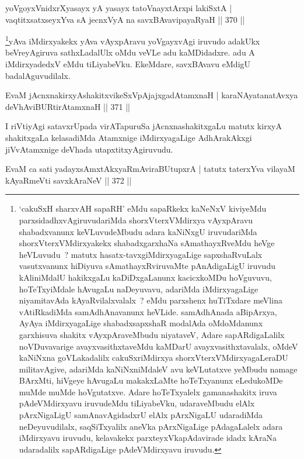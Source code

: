 \begin{shl}
yoVgoyxVnidxrXyasayx yA yasayx tatoV\s nayxtArxpi lakiSxtA |
vaqtitxsatxseyxYva sA jecnxVyA na savxBAvavipayaRyaH \hfill || 370 ||
\end{shl}

\begin{artha}
\footnote{`cakuSxH sharxvAH sapaRH' eMdu sapaRkekx kaNeNxV kiviyeMdu parxsidadhxvAgiruvudariMda shorxVterxVMdirxya vAyxpAravu shabadxvanunx keVLuvudeMbudu adara kaNiNxgU iruvudariMda shorxVterxVMdirxyakekx shabadxgarxhaNa sAmathayxRveMdu heVge heVLuvudu~? matutx hasatx-tavxgiMdirxyagaLige sapxshaRvuLalx vasutxvanunx hiDiyuva sAmathayxRviruvaMte pAnAdigaLigU iruvudu kAliniMdalU hakikxgaLu kaDiDxgaLanunx kacicxkoMDu hoVguvuvu, hoTeTxyiMdale hAvugaLu naDeyuvavu, adariMda iMdirxyagaLige niyamitavAda kAyaRvilalxvalalx~? eMdu parxshenx huTiTxdare meVlina vAtiRkadiMda samAdhAnavanunx heVLide. samAdhAnada aBipArxya, AyAya iMdirxyagaLige shabadxsapxshaR modalAda oMdoMdanunx garxhisuva shakitx vAyxpAraveMbudu niyataveV, Adare sapARdigaLalilx noVDuvavarige avayxvasithxtaveMdu kaMDarU avayxvasithxtavalalx, oMdeV kaNiNxna goVLakadalilx cakuSxriMdirxya shorxVterxVMdirxyagaLeraDU militavAgive, adariMda kaNiNxniMdaleV avu keVLutatxve yeMbudu namage BArxMti, hiVgeye hAvugaLu makakxLaMte hoTeTxyanunx eLedukoMDe muMde muMde hoVgutatxve. Adare hoTeTxyalelx gamanashakitx iruva pAdeVMdirxyavu iruvudeMdu tiLiyabeVku, udaraveMbudu elAlx pArxNigaLigU samAnavAgidadxrU elAlx pArxNigaLU udaradiMda neDeyuvudilalx, saqSiTxyalilx aneVka pArxNigaLige pAdagaLalelx adara iMdirxyavu iruvudu, kelavakekx parxteyxVkapAdavirade idadx kAraNa udaradalilx sapARdigaLige pAdeVMdirxyavu iruvudu.}yAva iMdirxyakekx yAva vAyxpAravu yoVgayxvAgi iruvudo adakUkx beVreyAgiruva sathxLadalUlx oMdu veVLe adu kaMDidadxre. adu A iMdirxyadedxV eMdu tiLiyabeVku. EkeMdare, savxBAvavu eMdigU badalAguvudilalx.
\end{artha}

\begin{shl}
EvaM jAcnxnakirxyAshakitxvikeSxVpAjajxgadAtamxnaH |
karaNAyatanatAvxya deVhAviBURtirAtamxnaH \hfill || 371 ||
\end{shl}

\begin{artha}
I riVtiyAgi satavxrUpada virATapuruSa jAcnxnashakitxgaLu matutx kirxyA shakitxgaLa kelasadiMda Atamxnige iMdirxyagaLige AdhArakAkxgi jiVvAtamxnige deVhada utapxtitxyAgiruvudu.
\end{artha}

\begin{shl}
EvaM ca sati yadayxsAmxtAkxyaRmAviraBUtupxrA |
tatutx taterxYva vilayaM kAyaRmeVti savxkAraNeV \hfill || 372 ||
\end{shl}

